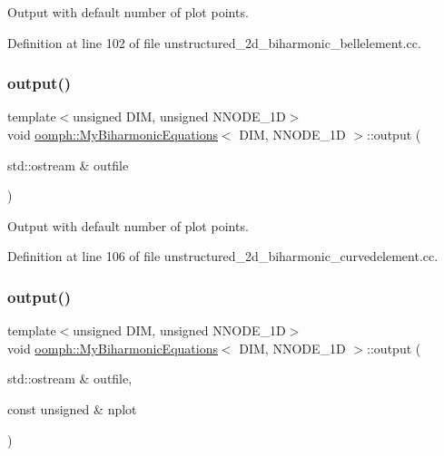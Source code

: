 Output with default number of plot points. 



Definition at line 102 of file unstructured\+\_\+2d\+\_\+biharmonic\+\_\+bellelement.\+cc.

\mbox{\label{classoomph_1_1MyBiharmonicEquations_aa0d1248dcc8fcebd986c295d6af2ebf6}} 
\subsubsection{\texorpdfstring{output()}{output()}\hspace{0.1cm}{\footnotesize\ttfamily [2/8]}}
{\footnotesize\ttfamily template$<$unsigned D\+IM, unsigned N\+N\+O\+D\+E\+\_\+1D$>$ \\
void \hyperlink{classoomph_1_1MyBiharmonicEquations}{oomph\+::\+My\+Biharmonic\+Equations}$<$ D\+IM, N\+N\+O\+D\+E\+\_\+1D $>$\+::output (\begin{DoxyParamCaption}\item[{std\+::ostream \&}]{outfile }\end{DoxyParamCaption})\hspace{0.3cm}{\ttfamily [inline]}}



Output with default number of plot points. 



Definition at line 106 of file unstructured\+\_\+2d\+\_\+biharmonic\+\_\+curvedelement.\+cc.

\mbox{\label{classoomph_1_1MyBiharmonicEquations_a9a2734695e94f83eb6d553a7090dbebd}} 
\subsubsection{\texorpdfstring{output()}{output()}\hspace{0.1cm}{\footnotesize\ttfamily [3/8]}}
{\footnotesize\ttfamily template$<$unsigned D\+IM, unsigned N\+N\+O\+D\+E\+\_\+1D$>$ \\
void \hyperlink{classoomph_1_1MyBiharmonicEquations}{oomph\+::\+My\+Biharmonic\+Equations}$<$ D\+IM, N\+N\+O\+D\+E\+\_\+1D $>$\+::output (\begin{DoxyParamCaption}\item[{std\+::ostream \&}]{outfile,  }\item[{const unsigned \&}]{nplot }\end{DoxyParamCaption})}



